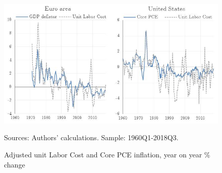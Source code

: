 \documentclass[11pt]{article}
\begin{document}
\begin{figure}[!htbp]
\begin{center}
\caption{Adjusted unit Labor Cost and Core PCE inflation, year on year \% change}\label{fig:yoy_detrend_inflation_LC}
\includegraphics[scale = .95]{Chart_EAUS_datadetrend.jpg}
\begin{minipage}{0.92\textwidth} {\footnotesize
Sources: Authors' calculations.
Sample: 1960Q1-2018Q3.\par}
\end{minipage}
\end{center}
\end{figure}
\end{document}
